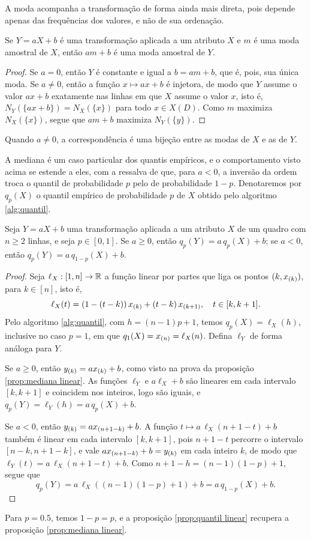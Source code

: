 A moda acompanha a transformação de forma ainda mais direta, pois depende apenas das
frequências dos valores, e não de sua ordenação.

\begin{prop:moda linear}
\label{prop:moda linear}
Se $Y=aX+b$ é uma transformação aplicada a um atributo $X$ e $m$ é uma moda amostral de
$X$, então $am + b$ é uma moda amostral de $Y$.
\end{prop:moda linear}
\begin{proof}
Se $a = 0$, então $Y$ é constante e igual a $b = am + b$, que é, pois, sua única moda.
Se $a \neq 0$, então a função $x \mapsto ax + b$ é injetora, de modo que $Y$ assume o
valor $ax + b$ exatamente nas linhas em que $X$ assume o valor $x$, isto é,
$N_Y(\{ax+b\}) = N_X(\{x\})$ para todo $x \in X(D)$.
Como $m$ maximiza $N_X(\{x\})$, segue que $am + b$ maximiza $N_Y(\{y\})$.
\end{proof}
Quando $a \neq 0$, a correspondência é uma bijeção entre as modas de $X$ e as de $Y$.

A mediana é um caso particular dos quantis empíricos, e o comportamento visto acima se
estende a eles, com a ressalva de que, para $a < 0$, a inversão da ordem troca o quantil
de probabilidade $p$ pelo de probabilidade $1 - p$.
Denotaremos por $q_p(X)$ o quantil empírico de probabilidade $p$ de $X$ obtido pelo
algoritmo \ref{alg:quantil}.

\begin{prop:quantil linear}
\label{prop:quantil linear}
Seja $Y=aX+b$ uma transformação aplicada a um atributo $X$ de um quadro com $n \ge 2$
linhas, e seja $p \in [0, 1]$.
Se $a \ge 0$, então $q_p(Y) = a\, q_p(X) + b$; se $a < 0$, então
$q_p(Y) = a\, q_{1-p}(X) + b$.
\end{prop:quantil linear}
\begin{proof}
Seja $\ell_X : [1, n] \to \mathbb{R}$ a função linear por partes que liga os pontos
$(k, x_{\left(k\right)})$, para $k \in [n]$, isto é,
\[
    \ell_X(t) = (1 - (t - k))\, x_{\left(k\right)} + (t - k)\, x_{\left(k+1\right)},
    \quad t \in [k, k+1].
\]
Pelo algoritmo \ref{alg:quantil}, com $h = (n-1)p + 1$, temos $q_p(X) = \ell_X(h)$,
inclusive no caso $p = 1$, em que $q_1(X) = x_{\left(n\right)} = \ell_X(n)$.
Defina $\ell_Y$ de forma análoga para $Y$.

Se $a \ge 0$, então $y_{\left(k\right)} = ax_{\left(k\right)} + b$, como visto na prova da proposição
\ref{prop:mediana linear}.
As funções $\ell_Y$ e $a\ell_X + b$ são lineares em cada intervalo $[k, k+1]$ e coincidem
nos inteiros, logo são iguais, e $q_p(Y) = \ell_Y(h) = a\, q_p(X) + b$.

Se $a < 0$, então $y_{\left(k\right)} = ax_{\left(n+1-k\right)} + b$.
A função $t \mapsto a\,\ell_X(n+1-t) + b$ também é linear em cada intervalo $[k, k+1]$,
pois $n + 1 - t$ percorre o intervalo $[n-k, n+1-k]$, e vale $ax_{\left(n+1-k\right)} + b = y_{\left(k\right)}$
em cada inteiro $k$, de modo que $\ell_Y(t) = a\,\ell_X(n+1-t) + b$.
Como $n + 1 - h = (n-1)(1-p) + 1$, segue que
\[
    q_p(Y) = a\,\ell_X((n-1)(1-p) + 1) + b = a\, q_{1-p}(X) + b.
\]
\end{proof}
Para $p = 0.5$, temos $1 - p = p$, e a proposição \ref{prop:quantil linear} recupera a
proposição \ref{prop:mediana linear}.

